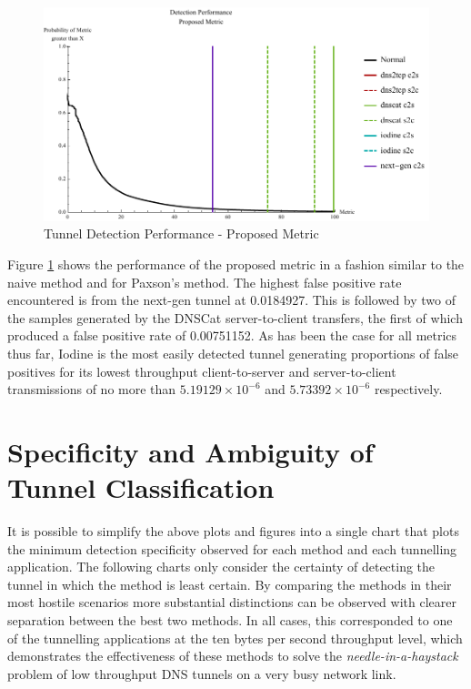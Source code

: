 \documentclass[12pt]{report}
\theoremstyle{remark}
\theoremstyle{definition}
\theoremstyle{definition}
\theoremstyle{definition}
\begin{document}
\begin{figure}
\centering
\includegraphics[width=\textwidth]{../figures/mphv-100.pdf}
\caption[Tunnel Detection Performance - Proposed Metric]{Tunnel Detection 
Performance - Proposed Metric}
\label{mphv}
\end{figure}

Figure \ref{mphv} shows the performance of the proposed metric in a fashion
similar to the naive method and for Paxson's method. The highest false positive
rate encountered is from the next-gen tunnel at 0.0184927. This is followed by
two of the samples generated by the DNSCat server-to-client transfers, the first
of which produced a false positive rate of 0.00751152. As has been the case for all
metrics thus far, Iodine is the most easily detected tunnel generating
proportions of false positives for its lowest throughput client-to-server and
server-to-client transmissions of no more than $5.19129\times10^{-6}$ and
$5.73392\times10^{-6}$ respectively.

\section{Specificity and Ambiguity of Tunnel Classification}
\label{detection-perf-cert}

It is possible to simplify the above plots and figures into a single chart that
plots the minimum detection specificity observed for each method and each
tunnelling application. The following charts only consider the certainty of
detecting the tunnel in which the method is least certain. By comparing the
methods in their most hostile scenarios more substantial distinctions can be
observed with clearer separation between the best two methods. In all cases,
this corresponded to one of the tunnelling applications at the ten bytes per
second throughput level, which demonstrates the effectiveness of these methods
to solve the \emph{needle-in-a-haystack} problem of low throughput DNS tunnels
on a very busy network link.
\end{document}
